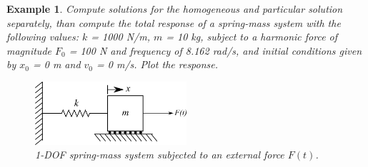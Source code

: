 \documentclass[12pt,letter]{article}
\newtheorem{ex}{Example}
\numberwithin{ex}{section} %
\newenvironment{example}{\begin{mdframed}[middlelinewidth=0.5mm]\begin{ex}\normalfont}{\end{ex}\end{mdframed}}
\numberwithin{re}{section} %
\begin{document}
\begin{example}

			Compute solutions for the homogeneous and particular solution separately, than compute the total response of a spring-mass system with the following values: $k$ = 1000 N/m, $m$ = 10 kg, subject to a harmonic force of magnitude $F_0$ = 100 N and frequency of 8.162 rad/s, and initial conditions given by $x_0$ = 0 m and $v_0$ = 0 m/s. Plot the response.
			
			\begin{figure}[H]
				\centering
				\includegraphics[width=0.5\textwidth]{../Figures/1-DOF-spring_mass_horizontal_forced.png}
				\caption{1-DOF spring-mass system subjected to an external force $F(t)$.}
			\end{figure}
			

\end{example}
\end{document}
